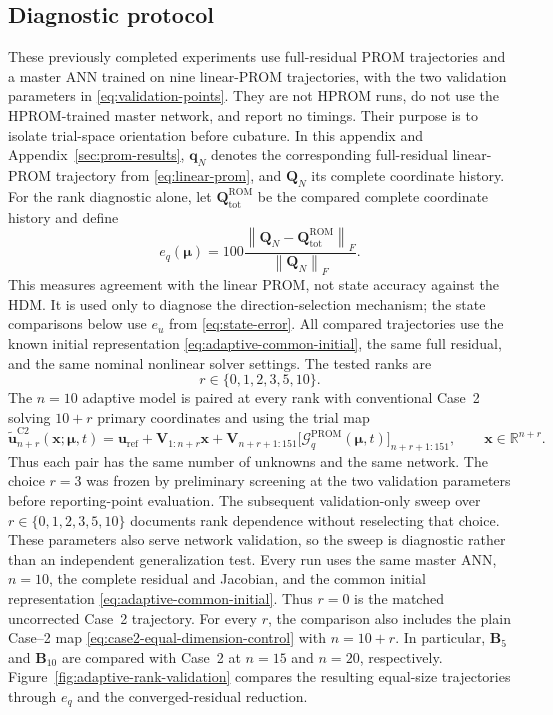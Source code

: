 \documentclass[11pt]{article}
\newcommand{\q}{\mathbf q}
\newcommand{\uvec}{\mathbf u}
\newcommand{\utilde}{\widetilde{\mathbf u}}
\newcommand{\mub}{\bm\mu}
\newcommand{\norm}[1]{\left\lVert #1 \right\rVert}
\begin{document}
\subsection{Diagnostic protocol}
\label{sec:adaptive-protocol}
These previously completed experiments use full-residual PROM trajectories
and a master ANN trained on nine linear-PROM trajectories, with the two
validation parameters in \eqref{eq:validation-points}.  They are not HPROM
runs, do not use the HPROM-trained master network, and report no timings.
Their purpose is to isolate trial-space orientation before cubature.
In this appendix and Appendix~\ref{sec:prom-results}, $\q_N$ denotes
the corresponding full-residual linear-PROM trajectory from
\eqref{eq:linear-prom}, and $\mathbf Q_N$ its complete coordinate history.
For the rank diagnostic alone, let $\mathbf Q_{\mathrm{tot}}^{\mathrm{ROM}}$
be the compared complete coordinate history and define
\begin{equation}
e_q(\mub)=100\frac{\norm{\mathbf Q_N-
\mathbf Q_{\mathrm{tot}}^{\mathrm{ROM}}}_F}{\norm{\mathbf Q_N}_F}.
\label{eq:coefficient-error}
\end{equation}
This measures agreement with the linear PROM, not state accuracy against
the HDM.  It is used only to diagnose the direction-selection mechanism;
the state comparisons below use $e_u$ from \eqref{eq:state-error}.
All compared trajectories use the known initial representation
\eqref{eq:adaptive-common-initial}, the same full residual, and the same
nominal nonlinear solver settings.  The tested ranks are
\begin{equation}
r\in\{0,1,2,3,5,10\}.
\label{eq:adaptive-tested-ranks}
\end{equation}
The $n=10$ adaptive model is paired at every rank with conventional Case~2
solving $10+r$ primary coordinates and using the trial map
\begin{equation}
\utilde_{n+r}^{\mathrm{C2}}(\mathbf x;\mub,t)
=\uvec_{\mathrm{ref}}+\mathbf V_{1:n+r}\mathbf x+
\mathbf V_{n+r+1:151}
\bigl[\mathcal G_q^{\mathrm{PROM}}(\mub,t)\bigr]_{n+r+1:151},
\qquad\mathbf x\in\mathbb R^{n+r}.
\label{eq:case2-equal-dimension-control}
\end{equation}
Thus each pair has the same number of unknowns and the same network.
The choice $r=3$ was frozen by preliminary screening at the two validation
parameters before reporting-point evaluation.  The subsequent
validation-only sweep over $r\in\{0,1,2,3,5,10\}$ documents rank
dependence without reselecting that choice.  These parameters also serve
network validation, so the sweep is diagnostic rather than an independent
generalization test.  Every run uses the same master ANN,
$n=10$, the complete residual and Jacobian, and the common initial
representation \eqref{eq:adaptive-common-initial}.  Thus $r=0$ is the
matched uncorrected Case~2 trajectory.  For every $r$, the comparison also
includes the plain Case--2 map \eqref{eq:case2-equal-dimension-control} with
$n=10+r$.  In particular, $\mathbf B_5$ and $\mathbf B_{10}$ are compared
with Case~2 at $n=15$ and $n=20$, respectively.
Figure~\ref{fig:adaptive-rank-validation} compares the resulting
equal-size trajectories through $e_q$ and the converged-residual reduction.
\end{document}
